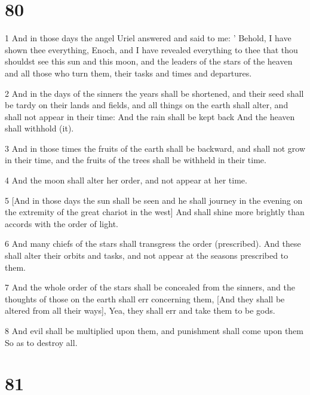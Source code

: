 \chapter{80}

\par 1 And in those days the angel Uriel answered and said to me: ' Behold, I have shown thee everything, Enoch, and I have revealed everything to thee that thou shouldst see this sun and this moon, and the leaders of the stars of the heaven and all those who turn them, their tasks and times and departures.
\par 2 And in the days of the sinners the years shall be shortened, and their seed shall be tardy on their lands and fields, and all things on the earth shall alter, and shall not appear in their time: And the rain shall be kept back And the heaven shall withhold (it).
\par 3 And in those times the fruits of the earth shall be backward, and shall not grow in their time, and the fruits of the trees shall be withheld in their time.
\par 4 And the moon shall alter her order, and not appear at her time.
\par 5 [And in those days the sun shall be seen and he shall journey in the evening on the extremity of the great chariot in the west] And shall shine more brightly than accords with the order of light.
\par 6 And many chiefs of the stars shall transgress the order (prescribed). And these shall alter their orbits and tasks, and not appear at the seasons prescribed to them.
\par 7 And the whole order of the stars shall be concealed from the sinners, and the thoughts of those on the earth shall err concerning them, [And they shall be altered from all their ways], Yea, they shall err and take them to be gods.
\par 8 And evil shall be multiplied upon them, and punishment shall come upon them So as to destroy all.

\chapter{81}

